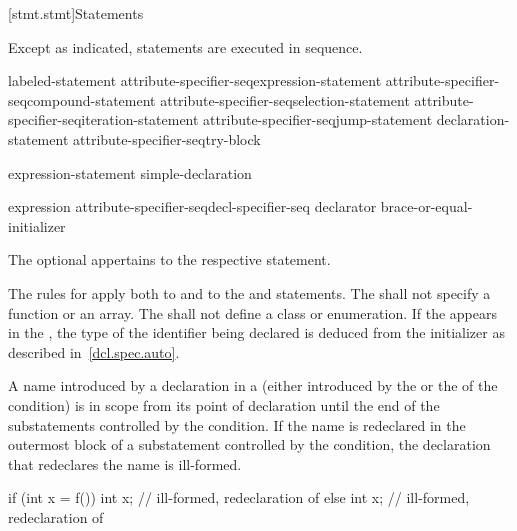 [stmt.stmt]{Statements}%



\pnum
Except as indicated, statements are executed in sequence.

\begin{bnf}
\br
    labeled-statement\br
    attribute-specifier-seq\opt expression-statement\br
    attribute-specifier-seq\opt compound-statement\br
    attribute-specifier-seq\opt selection-statement\br
    attribute-specifier-seq\opt iteration-statement\br
    attribute-specifier-seq\opt jump-statement\br
    declaration-statement\br
    attribute-specifier-seq\opt try-block

\br
    expression-statement\br
    simple-declaration

\br
    expression\br
    attribute-specifier-seq\opt decl-specifier-seq declarator brace-or-equal-initializer
\end{bnf}

The optional  appertains to the respective statement.

\pnum
{}%
The rules for  apply both to
 and to the  and 
statements. The  shall not
specify a function or an array. The  shall not
define a class or enumeration. If the   appears in
the ,
the type of the identifier being declared is deduced from the initializer as described in~\ref{dcl.spec.auto}.

\pnum
{}%
%
A name introduced by a declaration in a  (either
introduced by the  or the
 of the condition) is in scope from its point of
declaration until the end of the substatements controlled by the
condition. If the name is redeclared in the outermost block of a
substatement controlled by the condition, the declaration that
redeclares the name is ill-formed.
\begin{example}

\begin{codeblock}
if (int x = f()) {
  int x;            // ill-formed, redeclaration of 
}
else {
  int x;            // ill-formed, redeclaration of 
}
\end{codeblock}
\end{example}

